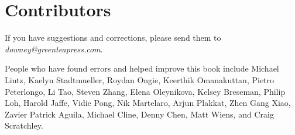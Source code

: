 \chapter*{Contributors}
\adjustmtc

If you have suggestions and corrections, please send them to
\emph{downey@greenteapress.com}.

People who have found errors and helped improve this book include
Michael Lintz,
Kaelyn Stadtmueller,
Roydan Ongie,
Keerthik Omanakuttan,
Pietro Peterlongo,
Li Tao,
Steven Zhang,
Elena Oleynikova,
Kelsey Breseman,
Philip Loh,
Harold Jaffe,
Vidie Pong,
Nik Martelaro,
Arjun Plakkat,
Zhen Gang Xiao,
Zavier Patrick Aguila,
Michael Cline,
Denny Chen,
Matt Wiens,
and Craig Scratchley.